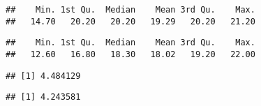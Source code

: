 \documentclass[
  12pt,
]{article}
\newenvironment{Shaded}{\begin{snugshade}}{\end{snugshade}}
\newcommand{\CommentTok}[1]{\textcolor[rgb]{0.56,0.35,0.01}{\textit{#1}}}
\newcommand{\DecValTok}[1]{\textcolor[rgb]{0.00,0.00,0.81}{#1}}
\newcommand{\FunctionTok}[1]{\textcolor[rgb]{0.00,0.00,0.00}{#1}}
\newcommand{\NormalTok}[1]{#1}
\newcommand{\OtherTok}[1]{\textcolor[rgb]{0.56,0.35,0.01}{#1}}
\newcommand{\SpecialCharTok}[1]{\textcolor[rgb]{0.00,0.00,0.00}{#1}}
\begin{document}
\begin{Shaded}
\end{Shaded}

\begin{verbatim}
##    Min. 1st Qu.  Median    Mean 3rd Qu.    Max. 
##   14.70   20.20   20.20   19.29   20.20   21.20
\end{verbatim}

\begin{Shaded}
\end{Shaded}

\begin{verbatim}
##    Min. 1st Qu.  Median    Mean 3rd Qu.    Max. 
##   12.60   16.80   18.30   18.02   19.20   22.00
\end{verbatim}

\begin{Shaded}
\end{Shaded}

\begin{verbatim}
## [1] 4.484129
\end{verbatim}

\begin{Shaded}
\end{Shaded}

\begin{verbatim}
## [1] 4.243581
\end{verbatim}
\end{document}
